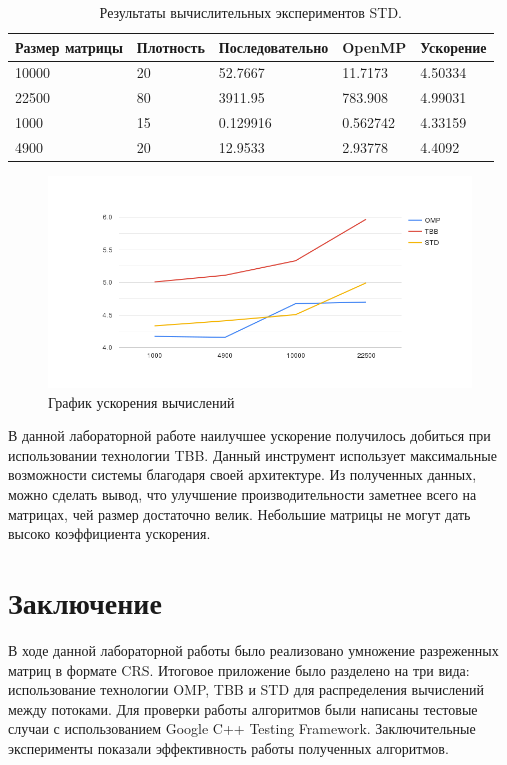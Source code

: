 \documentclass{report}
\begin{document}
\begin{table}[!h]
\begin{tabular}{ | l | l | l | l | | l }
\hline
Размер матрицы & Плотность & Последовательно & OpenMP & Ускорение \\ \hline
10000& 20 & 52.7667 & 11.7173 & 4.50334 \\
22500& 80 & 3911.95 & 783.908 & 4.99031 \\
1000 & 15 & 0.129916 & 0.562742 & 4.33159 \\
4900 & 20 & 12.9533 & 2.93778 & 4.4092 \\ \hline
\end{tabular}
\caption{Результаты вычислительных экспериментов STD.}
\end{table}
\newpage
\begin{figure}
\includegraphics[width=1\textwidth]{chart(5).png}
\caption{\label{fig:График}График ускорения вычислений}
\end{figure}
\par В данной лабораторной работе наилучшее ускорение получилось добиться при использовании технологии TBB. Данный инструмент использует максимальные возможности системы благодаря своей архитектуре. Из полученных данных, можно сделать вывод, что улучшение производительности заметнее всего на матрицах, чей размер достаточно велик. Небольшие матрицы не могут дать высоко коэффициента ускорения.
\newpage
\section*{Заключение}
\par В ходе данной лабораторной работы было реализовано умножение разреженных матриц в формате CRS. Итоговое приложение было разделено на три вида: использование технологии OMP, TBB и STD для распределения вычислений между потоками. Для проверки работы алгоритмов были написаны тестовые случаи с использованием Google C++ Testing Framework. Заключительные эксперименты показали эффективность работы полученных алгоритмов.
\newpage
\end{document}
